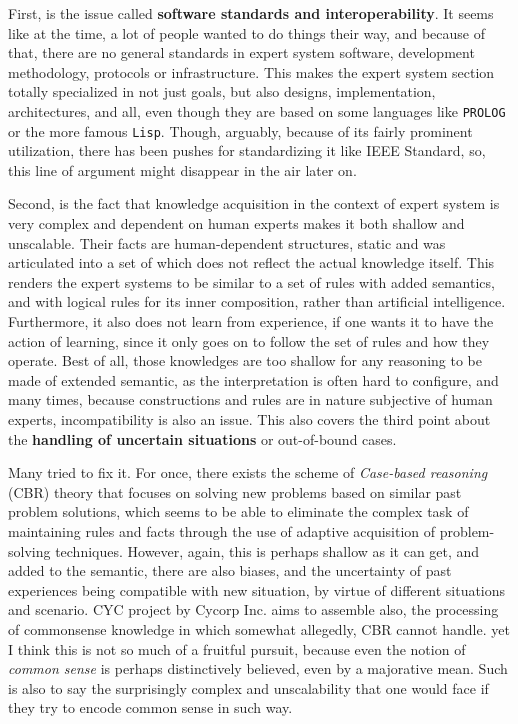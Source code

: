First, is the issue called \textbf{software standards and interoperability}. It seems like at the time, a lot of people wanted to do things their way, and because of that, there are no general standards in expert system software, development methodology, protocols or infrastructure. This makes the expert system section totally specialized in not just goals, but also designs, implementation, architectures, and all, even though they are based on some languages like \texttt{PROLOG} or the more famous \texttt{Lisp}. Though, arguably, because of its fairly prominent utilization, there has been pushes for standardizing it like IEEE Standard, so, this line of argument might disappear in the air later on. 

Second, is the fact that knowledge acquisition in the context of expert system is very complex and dependent on human experts makes it both shallow and unscalable. Their facts are human-dependent structures, static and was articulated into a set of which does not reflect the actual knowledge itself. This renders the expert systems to be similar to a set of rules with added semantics, and with logical rules for its inner composition, rather than artificial intelligence. Furthermore, it also does not learn from experience, if one wants it to have the action of learning, since it only goes on to follow the set of rules and how they operate. Best of all, those knowledges are too shallow for any reasoning to be made of extended semantic, as the interpretation is often hard to configure, and many times, because constructions and rules are in nature subjective of human experts, incompatibility is also an issue. This also covers the third point about the \textbf{handling of uncertain situations} or out-of-bound cases. 

Many tried to fix it. For once, there exists the scheme of \textit{Case-based reasoning} (CBR) theory that focuses on solving new problems based on similar past problem solutions, which seems to be able to eliminate the complex task of maintaining rules and facts through the use of adaptive acquisition of problem-solving techniques. However, again, this is perhaps shallow as it can get, and added to the semantic, there are also biases, and the uncertainty of past experiences being compatible with new situation, by virtue of different situations and scenario. CYC project by Cycorp Inc. aims to assemble also, the processing of commonsense knowledge in which somewhat allegedly, CBR cannot handle. yet I think this is not so much of a fruitful pursuit, because even the notion of \textit{common sense} is perhaps distinctively believed, even by a majorative mean. Such is also to say the surprisingly complex and unscalability that one would face if they try to encode common sense in such way. 

